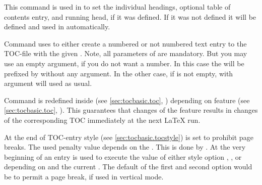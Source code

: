 \begin{Declaration}
\end{Declaration}
This command is used in  to set the individual
headings, optional table of contents entry, and running head, if it was
defined. If it was not defined it will be defined and used in
 automatically.
\EndIndexGroup


\begin{Declaration}
\end{Declaration}
Command 
uses  to either create a numbered or not numbered text
entry to the TOC-file with the given . Note, all parameters
of  are mandatory. But you may use an empty
 argument, if you do not want a number. In this case the
 will be prefixed by  without any argument. In
the other case, if  is not empty,
 with argument  will used as
usual.

Command  is redefined inside
 (see \autoref{sec:tocbasic.toc},
) depending on feature 
(see \autoref{sec:tocbasic.toc}, ). This
guarantees that changes of the feature results in changes of the corresponding
TOC immediately at the next \LaTeX{} run.%
\EndIndexGroup


\begin{Declaration}
\end{Declaration}
At the end of TOC-entry style
 (see \autoref{sec:tocbasic.tocstyle})  is set
to prohibit page breaks. The used penalty value depends on the . This is done by . At the very
beginning of an entry  is used to
execute the value of either style option ,
, or  depending on
 and the current . The default of the
first and second option would be to permit a page break, if used in vertical
mode.

